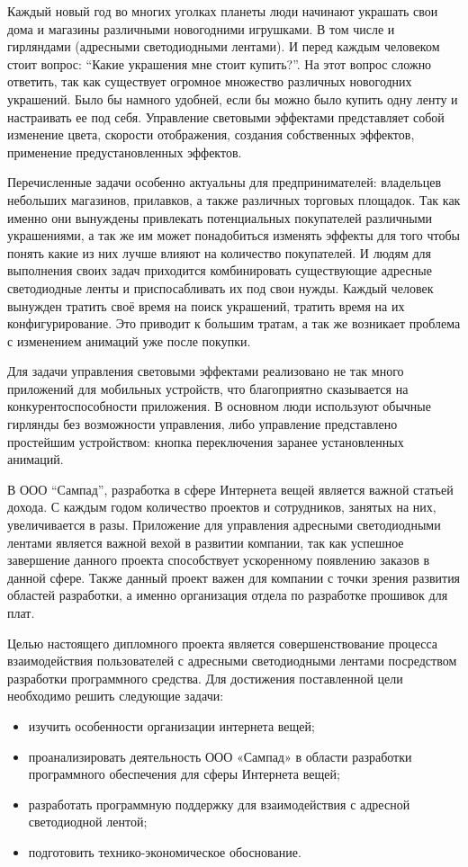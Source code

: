 \label{sec:introduction}

Каждый новый год во многих уголках планеты люди начинают украшать свои дома и магазины различными новогодними игрушками. В том числе и гирляндами (адресными светодиодными лентами). И перед каждым человеком стоит вопрос: \enquote{Какие украшения мне стоит купить?}. На этот вопрос сложно ответить, так как существует огромное множество различных новогодних украшений. Было бы намного удобней, если бы можно было купить одну ленту и настраивать ее под себя. Управление световыми эффектами представляет собой изменение цвета, скорости отображения, создания собственных эффектов, применение предустановленных эффектов.

Перечисленные задачи особенно актуальны для предпринимателей: владельцев небольших магазинов, прилавков, а также различных торговых площадок. Так как именно они вынуждены привлекать потенциальных покупателей различными украшениями, а так же им может понадобиться изменять эффекты для того чтобы понять какие из них лучше влияют на количество покупателей. И людям для выполнения своих задач приходится комбинировать существующие адресные светодиодные ленты и приспосабливать их под свои нужды. Каждый человек вынужден тратить своё время на поиск украшений, тратить время на их конфигурирование. Это приводит к большим тратам, а так же возникает проблема с изменением анимаций уже после покупки.

Для задачи управления световыми эффектами реализовано не так много приложений для мобильных устройств, что благоприятно сказывается на конкурентоспособности приложения. В основном люди используют обычные гирлянды без возможности управления, либо управление представлено простейшим устройством: кнопка переключения заранее установленных анимаций.

В ООО \enquote{Сампад}, разработка в сфере Интернета вещей является важной статьей дохода. С каждым годом количество проектов и сотрудников, занятых на них, увеличивается в разы. Приложение для управления адресными светодиодными лентами является важной вехой в развитии компании, так как успешное завершение данного проекта способствует ускоренному появлению заказов в данной сфере. Также данный проект важен для компании с точки зрения развития областей разработки, а именно организация отдела по разработке прошивок для плат.

Целью настоящего дипломного проекта является совершенствование процесса взаимодействия пользователей с адресными светодиодными лентами посредством разработки программного средства. Для достижения поставленной цели необходимо решить следующие задачи:
\begin{itemize}
\item изучить особенности организации интернета вещей;
\item проанализировать деятельность ООО «Сампад» в области разработки программного обеспечения для сферы Интернета вещей;
\item разработать программную поддержку для взаимодействия с адресной светодиодной лентой;
\item подготовить технико-экономическое обоснование.
\end{itemize}